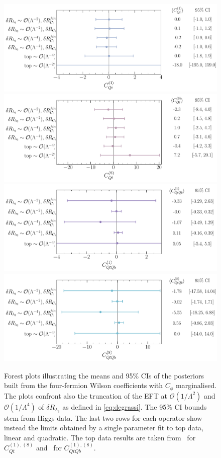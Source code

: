 \begin{figure}[htpb!]
	\vspace*{-0.5cm}
	\begin{center}
		\includegraphics[width=0.75\linewidth]{fig/uebeblick_Cqt1}
		\includegraphics[width=0.75\linewidth]{fig/uebeblick_Cqt8} 
		\includegraphics[width=0.75\linewidth]{fig/uebeblick_Cqtqb1}
		\includegraphics[width=0.75\linewidth]{fig/uebeblick_Cqtqb8}
	\end{center}
	\vspace*{-0.5cm}
	\caption{Forest plots illustrating the means and 95\% CIs of the posteriors built from the four-fermion Wilson coefficients with $C_\phi$ marginalised.  The plots confront also the truncation of the EFT at $\mathcal{O}(1/\Lambda^2)$ and $\mathcal{O}(1/\Lambda^4)$ of $\delta R_{\lambda_3}$ as defined in \eqref{eq:degrassi}. The 95\% CI bounds stem from Higgs data. The last two rows for each operator show instead the limits obtained by a single parameter fit to top data, linear and quadratic. The top data results are taken from~\cite{Ethier:2021bye} for $C_{Qt}^{(1),(8)}$ and~\cite{Hartland:2019bjb} for $C_{QtQb}^{(1),(8)}$. }
		\label{fig:summ4f}
\end{figure}
